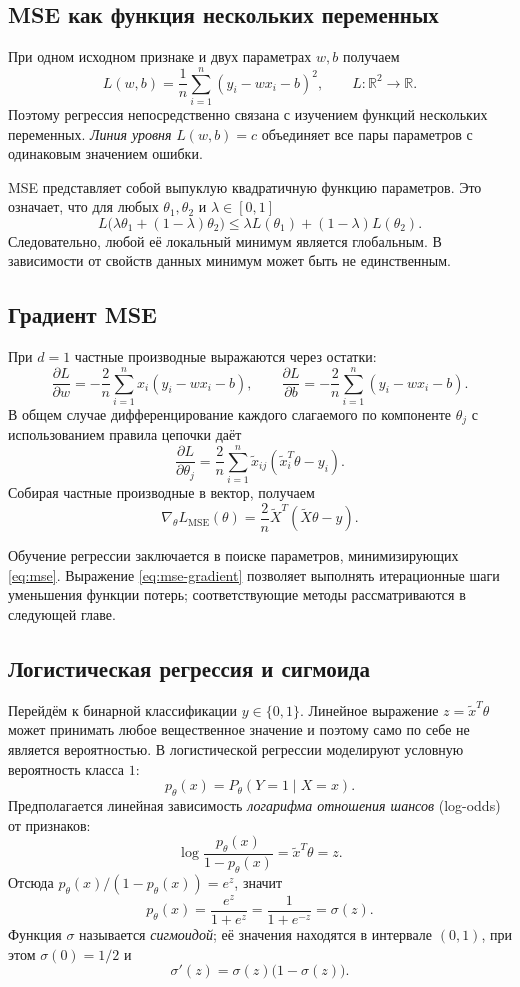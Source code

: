 \documentclass[12pt,a4paper]{article}
\newcommand{\R}{\mathbb{R}}
\begin{document}
\subsection{MSE как функция нескольких переменных}

При одном исходном признаке и двух параметрах $w,b$ получаем
\[
    L(w,b)=\frac1n\sum_{i=1}^{n}(y_i-wx_i-b)^2,
    \qquad L:\R^2\to\R.
\]
Поэтому регрессия непосредственно связана с изучением
функций нескольких переменных. \emph{Линия уровня}
$L(w,b)=c$ объединяет все пары параметров с одинаковым значением ошибки.

MSE представляет собой выпуклую квадратичную функцию параметров.
Это означает, что для любых $\theta_1,\theta_2$ и $\lambda\in[0,1]$
\[
    L\bigl(\lambda\theta_1+(1-\lambda)\theta_2\bigr)
    \le \lambda L(\theta_1)+(1-\lambda)L(\theta_2).
\]
Следовательно, любой её локальный минимум является глобальным.
В зависимости от свойств данных минимум может быть не единственным.

\subsection{Градиент MSE}

При $d=1$ частные производные выражаются через остатки:
\[
    \frac{\partial L}{\partial w}=
    -\frac2n\sum_{i=1}^{n}x_i(y_i-wx_i-b),
    \qquad
    \frac{\partial L}{\partial b}=
    -\frac2n\sum_{i=1}^{n}(y_i-wx_i-b).
\]
В общем случае дифференцирование каждого слагаемого по компоненте
$\theta_j$ с использованием правила цепочки даёт
\[
    \frac{\partial L}{\partial\theta_j}
    =\frac2n\sum_{i=1}^{n}
      \widetilde x_{ij}(\widetilde x_i^T\theta-y_i).
\]
Собирая частные производные в вектор, получаем
\begin{equation}
    \boxed{\nabla_\theta L_{\mathrm{MSE}}(\theta)
     =\frac2n\widetilde X^T(\widetilde X\theta-y)}.
    \label{eq:mse-gradient}
\end{equation}

Обучение регрессии заключается в поиске параметров, минимизирующих
\eqref{eq:mse}. Выражение \eqref{eq:mse-gradient} позволяет выполнять
итерационные шаги уменьшения функции потерь; соответствующие методы
рассматриваются в следующей главе.

\subsection{Логистическая регрессия и сигмоида}

Перейдём к бинарной классификации $y\in\{0,1\}$.
Линейное выражение $z=\widetilde x^T\theta$ может принимать
любое вещественное значение и поэтому само по себе не является вероятностью.
В логистической регрессии моделируют условную вероятность класса $1$:
\[
    p_\theta(x)=P_\theta(Y=1\mid X=x).
\]
Предполагается линейная зависимость \emph{логарифма отношения шансов}
(log-odds) от признаков:
\[
    \log\frac{p_\theta(x)}{1-p_\theta(x)}
    =\widetilde x^T\theta=z.
\]
Отсюда $p_\theta(x)/(1-p_\theta(x))=e^z$, значит
\[
    p_\theta(x)=\frac{e^z}{1+e^z}
    =\frac1{1+e^{-z}}=\sigma(z).
\]
Функция $\sigma$ называется \emph{сигмоидой}; её значения находятся
в интервале $(0,1)$, при этом $\sigma(0)=1/2$ и
\[
    \sigma'(z)=\sigma(z)\bigl(1-\sigma(z)\bigr).
\]
\end{document}

